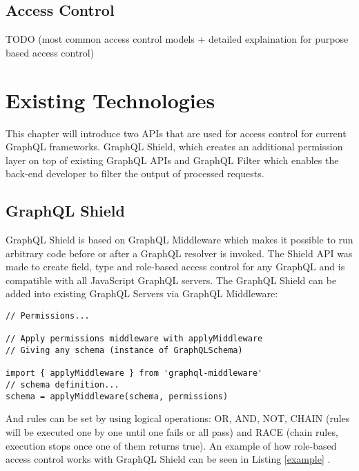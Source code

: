 \documentclass[conference]{IEEEtran}
\begin{document}
\subsection{Access Control}\label{access_control}

TODO (most common access control models + detailed explaination for purpose based access control)

\section{Existing Technologies}\label{ex_tech}

This chapter will introduce two APIs that are used for access control for current GraphQL frameworks. GraphQL Shield, which creates an additional permission layer on top of existing GraphQL APIs and GraphQL Filter which enables the back-end developer to filter the output of processed requests.

\subsection{GraphQL Shield}\label{shield}

GraphQL Shield is based on GraphQL Middleware which makes it possible to run arbitrary code before or after a GraphQL resolver is invoked. The Shield API was made to create field, type and role-based access control for any GraphQL and is compatible with all JavaScript GraphQL servers. The GraphQL Shield can be added into existing GraphQL Servers via GraphQL Middleware:

\begin{lstlisting}[label=some-code,caption=Integration \cite{b1}]
// Permissions...

// Apply permissions middleware with applyMiddleware
// Giving any schema (instance of GraphQLSchema)

import { applyMiddleware } from 'graphql-middleware'
// schema definition...
schema = applyMiddleware(schema, permissions)
\end{lstlisting}

And rules can be set by using logical operations: OR, AND, NOT, CHAIN (rules will be executed one by one until one fails or all pass) and RACE (chain rules, execution stops once one of them returns true). An example of how role-based access control works with GraphQL Shield can be seen in Listing \ref{example} .
\end{document}
